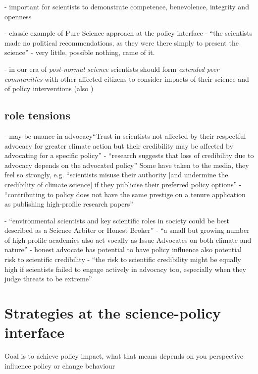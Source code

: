 \cite{ColognaKMBMO2024} - important for scientists to demonstrate competence, benevolence, integrity and openness

\cite{Horton2022} - classic example of Pure Science approach at the policy interface - ``the scientists made no political recommendations, as they were there simply to present the science'' - very little, possible nothing, came of it.

\cite{FuntowiczR1993,Jasanoff2003} - in our era of \emph{post-normal science} scientists should form \emph{extended peer communities} with other affected citizens to consider impacts of their science and of policy interventions (also \cite{KalafatisL2019})

\subsection{role tensions}
\cite{ColognaKMBMO2024} - may be nuance in advocacy``Trust in scientists not affected by their respectful advocacy for greater climate action but their credibility may be affected by advocating for a specific policy''
\cite{DablanderSCSBGGBAH2024} - ``research suggests that loss of credibility due to advocacy depends on the advocated policy''
Some have taken to the media, they feel so strongly, e.g. ``scientists misuse their authority [and undermine the credibility of climate science] if they publicise their preferred policy options'' \cite{Edwards2013}
\cite{Gerber2023} - ``contributing to policy does not have the same prestige on a tenure application as publishing high-profile research papers''

\cite{GregoryBW2024} - ``environmental scientists and key scientific roles in society could be best described as a Science Arbiter or Honest Broker''
\cite{GregoryBW2024} - ``a small but growing number of high-profile academics also act vocally as Issue Advocates on both climate and nature''
\cite{GregoryBW2024} - honest advocate has potential to have policy influence also potential risk to scientific credibility
\cite{GregoryBW2024} - ``the risk to scientific credibility might be equally high if scientists failed to engage actively in advocacy too, especially when they judge threats to be extreme''

\section{Strategies at the science-policy interface}\label{sec:litstrat}
Goal is to achieve policy impact, what that means depends on you perspective
influence policy or change behaviour

